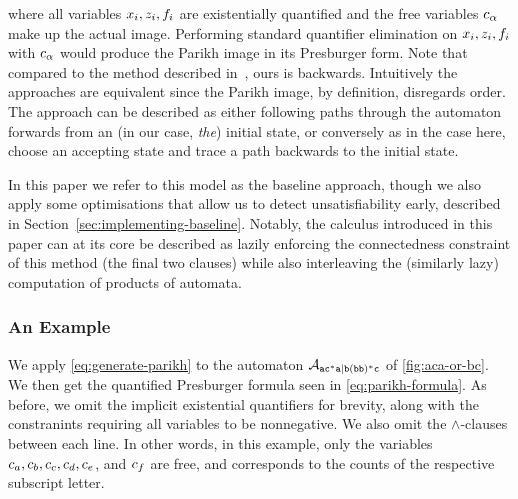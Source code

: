 \documentclass[acmsmall,review,anonymous,screen]{acmart}\settopmatter{printfolios=true,printccs=false,printacmref=true}
\theoremstyle{definition}
\begin{document}
where all variables $x_i, z_i, f_i$ are
existentially quantified and the free variables $c_\alpha$ make up the
actual image. Performing standard quantifier elimination on $x_i,
z_i, f_i$ with $c_\alpha$ would produce the
Parikh image in its Presburger form. Note that compared to the method described
in~\cite{generate-parikh-image}, ours is backwards. Intuitively the approaches
are equivalent since the Parikh image, by definition, disregards order. The
approach can be described as either following paths through the automaton
forwards from an (in our case, \emph{the}) initial state, or conversely as in
the case here, choose an accepting state and trace a path backwards to the
initial state. 

In this paper we refer to this model as the baseline approach, though we also
apply some optimisations that allow us to detect unsatisfiability early,
described in Section~\ref{sec:implementing-baseline}. Notably, the calculus
introduced in this paper can at its core be described as lazily enforcing the
connectedness constraint of this method (the final two clauses) while also
interleaving the (similarly lazy) computation of products of automata.

\subsubsection{An Example}
We apply \eqref{eq:generate-parikh} to the automaton $\mathcal{A}_{\mathtt{ac^*a|b(bb)^*c}}{}$ of \cref{fig:aca-or-bc}. We then get the quantified Presburger formula seen in \eqref{eq:parikh-formula}. As before, we omit the implicit existential quantifiers for brevity, along with the constranints requiring all variables to be nonnegative. We also omit the $\land$-clauses between each line. In other words, in this example, only the variables $c_a, c_b, c_c, c_d, c_e$, and $c_f$ are free, and corresponds to the counts of the respective subscript letter.
\end{document}
